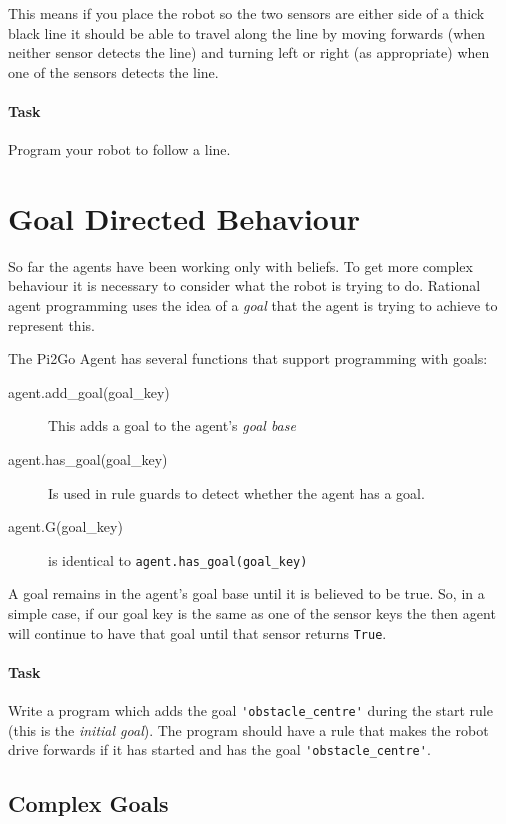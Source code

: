 \documentclass[a4,12pt]{article}
\begin{document}
This means if you place the robot so the two sensors are either side of a thick black line it should be able to travel along the line by moving forwards (when neither sensor detects the line) and turning left or right (as appropriate) when one of the sensors detects the line.

\paragraph{Task} Program your robot to follow a line.

\section{Goal Directed Behaviour}
\label{sec:goals}

So far the agents have been working only with beliefs.  To get more complex behaviour it is necessary to consider what the robot is trying to do.  Rational agent programming uses the idea of a \emph{goal} that the agent is trying to achieve to represent this.

The Pi2Go Agent has several functions that support programming with goals:

\begin{description}
\item[agent.add\_goal(goal\_key)] This adds a goal to the agent's \emph{goal base}
\item[agent.has\_goal(goal\_key)] Is used in rule guards to detect whether the agent has a goal.
\item[agent.G(goal\_key)] is identical to \lstinline{agent.has_goal(goal_key)}
\end{description}

A goal remains in the agent's goal base until it is believed to be true.  So, in a simple case, if our goal key is the same as one of the sensor keys the then agent will continue to have that goal until that sensor returns \lstinline{True}.

\paragraph{Task}  Write a program which adds the goal \lstinline{'obstacle_centre'} during the start rule (this is the \emph{initial goal}).  The program should have a rule that makes the robot drive forwards if it has started and has the goal \lstinline{'obstacle_centre'}.

\subsection{Complex Goals}
\end{document}
